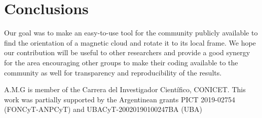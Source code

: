 \documentclass[baaa]{baaa}
\begin{document}
\section{Conclusions}
Our goal was to make an easy-to-use tool for the community publicly available to find the orientation of a magnetic cloud and rotate it to its local frame.
We hope our contribution will be useful to other researchers and provide a good synergy for the area encouraging other groups to make their coding available to the community as well for transparency and reproducibility of the results.
\begin{acknowledgement}
A.M.G is member of the Carrera del Investigador Científico, CONICET. This work was partially supported by the Argentinean grants PICT 2019-02754 (FONCyT-ANPCyT) and UBACyT-20020190100247BA (UBA)
\end{acknowledgement}


\small

\end{document}
